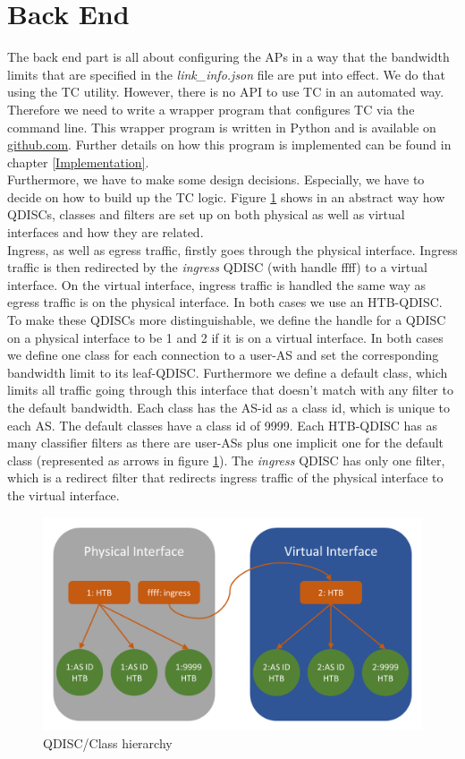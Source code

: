 \section{Back End}

The back end part is all about configuring the \acsp{AP} in a way that the bandwidth limits that are specified in the \textit{link\_info.json} file are put into effect. We do that using the \acs{TC} utility. However, there is no \acs{API} to use \acs{TC} in an automated way. Therefore we need to write a wrapper program that configures \acs{TC} via the command line. This wrapper program is written in Python and is available on \href{https://github.com/ManuelMeinen/SCIONLab_Bandwidth_Limiter}{github.com}\cite{meinen2019scionlabBwLimiter}. Further details on how this program is implemented can be found in chapter \ref{Implementation}.
\\
Furthermore, we have to make some design decisions. Especially, we have to decide on how to build up the \acs{TC} logic. Figure \ref{QDISC-Set-up} shows in an abstract way how \acsp{QDISC}, classes and filters are set up on both physical as well as virtual interfaces and how they are related.
\\
Ingress, as well as egress traffic, firstly goes through the physical interface. Ingress traffic is then redirected by the \textit{ingress} \acs{QDISC} (with handle ffff) to a virtual interface. On the virtual interface, ingress traffic is handled the same way as egress traffic is on the physical interface. In both cases we use an \acs{HTB}-\acs{QDISC}. To make these \acsp{QDISC} more distinguishable, we define the handle for a \acs{QDISC} on a physical interface to be 1 and 2 if it is on a virtual interface. In both cases we define one class for each connection to a user-\acs{AS} and set the corresponding bandwidth limit to its leaf-\acs{QDISC}. Furthermore we define a default class, which limits all traffic going through this interface that doesn't match with any filter to the default bandwidth. Each class has the \acs{AS}-id as a class id, which is unique to each \acs{AS}. The default classes have a class id of 9999. Each \acs{HTB}-\acs{QDISC} has as many classifier filters as there are user-\acsp{AS} plus one implicit one for the default class (represented as arrows in figure \ref{QDISC-Set-up}). The \textit{ingress} \acs{QDISC} has only one filter, which is a redirect filter that redirects ingress traffic of the physical interface to the virtual interface.
\begin{figure}[h]
	\centering
	\includegraphics[width=\textwidth]{img/QDISC-Set-up.png}
	\caption{QDISC/Class hierarchy}
	\label{QDISC-Set-up}
\end{figure}